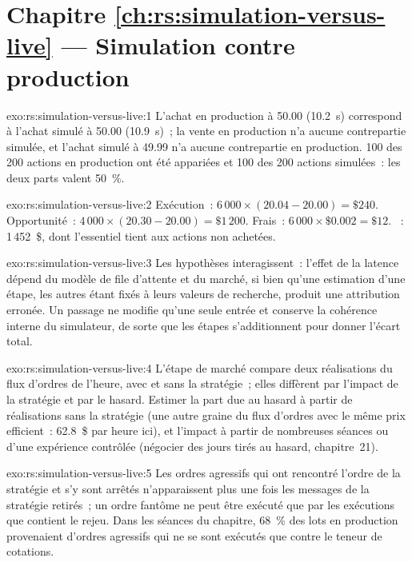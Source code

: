 \section*{Chapitre \ref{ch:rs:simulation-versus-live} --- Simulation contre production}

\begin{solution}{exo:rs:simulation-versus-live:1}
L'achat en production à 50.00 (10.2~s) correspond à l'achat simulé à 50.00 (10.9~s)~; la vente en production n'a aucune contrepartie simulée, et l'achat simulé à 49.99 n'a aucune contrepartie en production.
100 des 200 actions en production ont été appariées et 100 des 200 actions simulées~: les deux parts valent 50~\%.
\end{solution}

\begin{solution}{exo:rs:simulation-versus-live:2}
Exécution~: $6\,000 \times (20.04 - 20.00) = \$240$. Opportunité~: $4\,000 \times (20.30 - 20.00) = \$1\,200$. Frais~: $6\,000 \times \$0.002 = \$12$. ~:
1\,452~\$, dont l'essentiel tient aux actions non achetées.
\end{solution}

\begin{solution}{exo:rs:simulation-versus-live:3}
Les hypothèses interagissent~: l'effet de la latence dépend du modèle de file d'attente et du marché, si bien qu'une estimation d'une étape, les autres étant fixés à leurs valeurs de recherche,
produit une attribution erronée. Un passage ne modifie qu'une seule entrée et conserve la cohérence interne du simulateur, de sorte que les étapes s'additionnent pour donner l'écart total.
\end{solution}

\begin{solution}{exo:rs:simulation-versus-live:4}
L'étape de marché compare deux réalisations du flux d'ordres de l'heure, avec et sans la stratégie~; elles diffèrent par l'impact de la stratégie et par le hasard. Estimer la
part due au hasard à partir de réalisations sans la stratégie (une autre graine du flux d'ordres avec le même prix efficient~: 62.8~\$ par heure ici), et l'impact à partir de nombreuses séances
ou d'une expérience contrôlée (négocier des jours tirés au hasard, chapitre~21).
\end{solution}

\begin{solution}{exo:rs:simulation-versus-live:5}
Les ordres agressifs qui ont rencontré l'ordre de la stratégie et s'y sont arrêtés n'apparaissent plus une fois les messages de la stratégie retirés~; un ordre fantôme ne peut être exécuté que
par les exécutions que contient le rejeu. Dans les séances du chapitre, 68~\% des lots en production provenaient d'ordres agressifs qui ne se sont exécutés que contre le teneur de cotations.
\end{solution}

